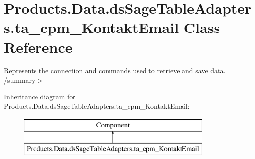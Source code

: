 \hypertarget{class_products_1_1_data_1_1ds_sage_table_adapters_1_1ta__cpm___kontakt_email}{}\section{Products.\+Data.\+ds\+Sage\+Table\+Adapters.\+ta\+\_\+cpm\+\_\+\+Kontakt\+Email Class Reference}
\label{class_products_1_1_data_1_1ds_sage_table_adapters_1_1ta__cpm___kontakt_email}


Represents the connection and commands used to retrieve and save data. /summary$>$  


Inheritance diagram for Products.\+Data.\+ds\+Sage\+Table\+Adapters.\+ta\+\_\+cpm\+\_\+\+Kontakt\+Email\+:\begin{figure}[H]
\begin{center}
\leavevmode
\includegraphics[height=2.000000cm]{class_products_1_1_data_1_1ds_sage_table_adapters_1_1ta__cpm___kontakt_email}
\end{center}
\end{figure}

